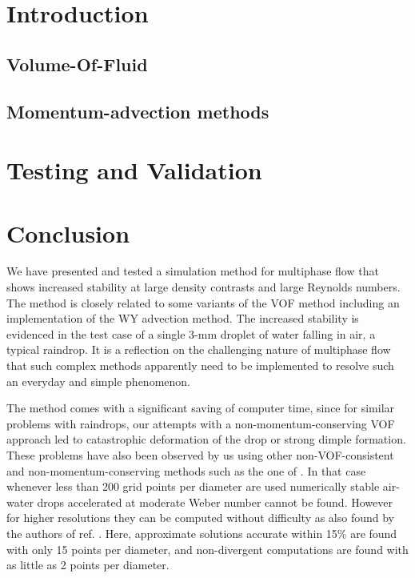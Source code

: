 \documentclass[times,final]{elsarticle}
\begin{document}
\newcommand\division[1]{\subsection{#1}}
\newcommand\subdivision[1]{\subsubsection{#1}}
\newcommand\onlybook[1]{{}}
\newcommand\opus{article}
\newcommand\reduit[1]{#1}
\newcommand\LLL{{\cal L}}
\section{Introduction} 



\subsection{Volume-Of-Fluid}
\label{vof}


\subsection{Momentum-advection methods}
\label{mom}



\section{Testing and Validation}
\label{test}


\section{Conclusion}

We have presented and tested a simulation method for multiphase flow
that shows increased stability at large density contrasts and large
Reynolds numbers. The method is closely related to some variants of
the VOF method including an implementation of the WY advection method. 
The increased stability is evidenced in the test case
of a single $3$-mm droplet of water falling in air, a typical
raindrop. It is a reflection on the challenging nature of multiphase
flow that such complex methods apparently need to be implemented to
resolve such an everyday and simple phenomenon.

The method comes with a significant saving of computer time, since for 
similar problems with raindrops, our attempts with a non-momentum-conserving
VOF approach led to catastrophic deformation of the drop or strong dimple 
formation. These problems have also been observed by us using other 
non-VOF-consistent and non-momentum-conserving methods such as the one of 
\cite{popinet09}. In that case whenever less than 200 grid points per 
diameter are used numerically stable air-water 
drops accelerated at moderate Weber number cannot be found. However for
higher resolutions they can be computed without difficulty as also found 
by the authors of ref. \cite{Jain15}.
Here, approximate solutions accurate within 15\% are found with only 15 
points per diameter, and non-divergent computations are found with as little 
as 2 points per diameter. 
\end{document}
